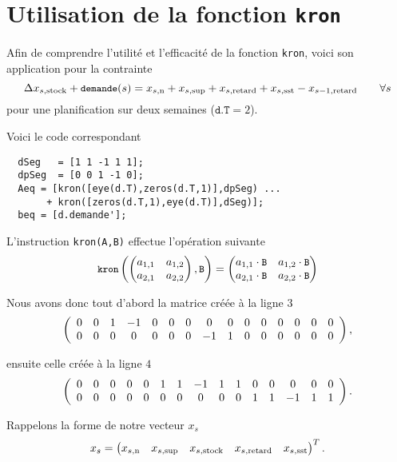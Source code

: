 \section{Utilisation de la fonction \texttt{kron}}
\label{app:kron}

\lstset{language=MATLAB}

Afin de comprendre l'utilité et l'efficacité de la fonction \texttt{kron},
voici son application pour la contrainte
\[ 
  \Delta x_{s,\text{stock}} + {\small\texttt{demande}}(s) = x_{s,\text{n}} + x_{s,\text{sup}} 
  + x_{s,\text{retard}} + x_{s,\text{sst}} - x_{s-1,\text{retard}} \qquad \forall s
\]
pour une planification sur deux semaines ($\texttt{d.T}=2$).

Voici le code correspondant
\begin{lstlisting}
  dSeg   = [1 1 -1 1 1];
  dpSeg  = [0 0 1 -1 0];
  Aeq = [kron([eye(d.T),zeros(d.T,1)],dpSeg) ...
       + kron([zeros(d.T,1),eye(d.T)],dSeg)];
  beq = [d.demande'];   
\end{lstlisting}

L'instruction \lstinline{kron(A,B)} effectue l'opération suivante
\[ 
  {\small\texttt{kron}}
    \left(
      \begin{pmatrix} a_{1,1} & a_{1,2} \\ a_{2,1} & a_{2,2} \end{pmatrix}, 
      {\small\texttt{B}}
    \right)
  =
  \begin{pmatrix} a_{1,1} \cdot{\small\texttt{B}} & a_{1,2} \cdot{\small\texttt{B}}
    \\ a_{2,1}\cdot{\small\texttt{B}} & a_{2,2} \cdot{\small\texttt{B}}
  \end{pmatrix}
\]

Nous avons donc tout d'abord la matrice créée à la ligne $3$
\[
    \left(
    \begin{array}{*{15}c}
      0 & 0 & 1 & -1 & 0 & 0 & 0 &  0 & 0 & 0 & 0 & 0 & 0 & 0 & 0 \\
      0 & 0 & 0 &  0 & 0 & 0 & 0 & -1 & 1 & 0 & 0 & 0 & 0 & 0 & 0 
    \end{array}
    \right),
\]

ensuite celle créée à la ligne $4$
\[
    \left(
    \begin{array}{*{15}c}
      0 & 0 & 0 & 0 & 0 & 1 & 1 & -1 & 1 & 1 & 0 & 0 & 0 & 0 & 0 \\
      0 & 0 & 0 & 0 & 0 & 0 & 0 &  0 & 0 & 0 & 1 & 1 & -1 & 1 & 1 
    \end{array}
    \right).
\]


Rappelons la forme de notre vecteur $x_s$
\[ x_s = 
  \begin{pmatrix} 
    x_{s,\text{n}} &x_{s,\text{sup}} &x_{s,\text{stock}} &x_{s,\text{retard}} &x_{s,\text{sst}}
  \end{pmatrix}^T.
\]

